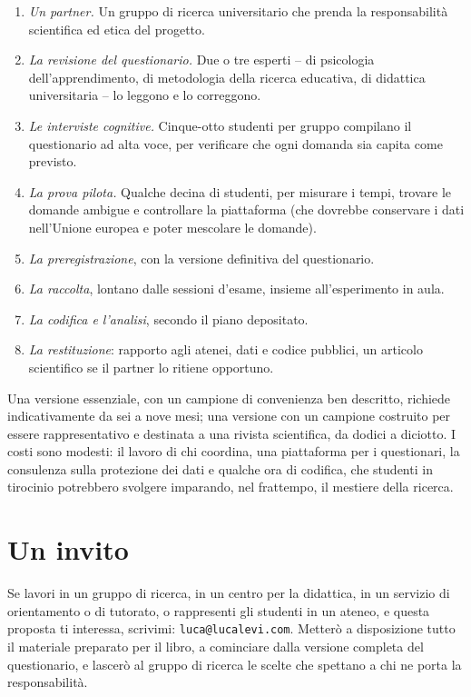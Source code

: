 \begin{enumerate}[leftmargin=1.6em, itemsep=0.2\baselineskip]
  \item \emph{Un partner.} Un gruppo di ricerca universitario che
        prenda la responsabilità scientifica ed etica del progetto.
  \item \emph{La revisione del questionario.} Due o tre esperti -- di
        psicologia dell'apprendimento, di metodologia della ricerca
        educativa, di didattica universitaria -- lo leggono e lo
        correggono.
  \item \emph{Le interviste cognitive.} Cinque-otto studenti per gruppo
        compilano il questionario ad alta voce, per verificare che ogni
        domanda sia capita come previsto.
  \item \emph{La prova pilota.} Qualche decina di studenti, per
        misurare i tempi, trovare le domande ambigue e controllare la
        piattaforma (che dovrebbe conservare i dati nell'Unione europea
        e poter mescolare le domande).
  \item \emph{La preregistrazione}, con la versione definitiva del
        questionario.
  \item \emph{La raccolta}, lontano dalle sessioni d'esame, insieme
        all'esperimento in aula.
  \item \emph{La codifica e l'analisi}, secondo il piano depositato.
  \item \emph{La restituzione}: rapporto agli atenei, dati e codice
        pubblici, un articolo scientifico se il partner lo ritiene
        opportuno.
\end{enumerate}

Una versione essenziale, con un campione di convenienza ben descritto,
richiede indicativamente da sei a nove mesi; una versione con un
campione costruito per essere rappresentativo e destinata a una rivista
scientifica, da dodici a diciotto. I costi sono modesti: il lavoro di
chi coordina, una piattaforma per i questionari, la consulenza sulla
protezione dei dati e qualche ora di codifica, che studenti in tirocinio
potrebbero svolgere imparando, nel frattempo, il mestiere della ricerca.

\section{Un invito}

Se lavori in un gruppo di ricerca, in un centro per la didattica, in un
servizio di orientamento o di tutorato, o rappresenti gli studenti in
un ateneo, e questa proposta ti interessa, scrivimi:
\texttt{luca@lucalevi.com}.
Metterò a disposizione tutto il materiale preparato per il libro, a
cominciare dalla versione completa del questionario, e lascerò al
gruppo di ricerca le scelte che spettano a chi ne porta la
responsabilità.

